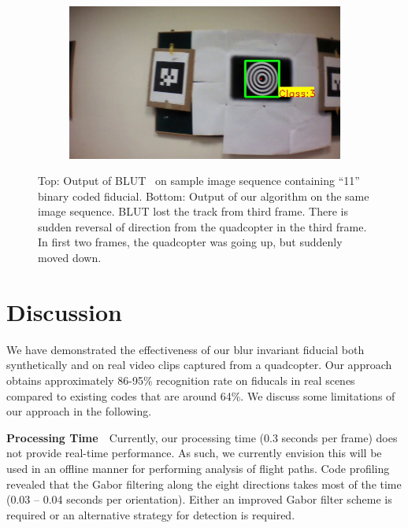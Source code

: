 \documentclass[runningheads]{llncs}
\begin{document}
\begin{figure}
\begin{subfigure}[b]{.19\textwidth}
\end{subfigure}
\begin{subfigure}[b]{.19\textwidth}
\includegraphics[width=\linewidth]{BLUT_input_11/output6.jpg}
\end{subfigure}
\caption{Top: Output of BLUT~\cite{Wu:2011} on sample image sequence containing
``11'' binary coded fiducial. Bottom: Output of our algorithm on the same image
sequence. BLUT lost the track from third frame. There is sudden reversal of
direction from the quadcopter in the third frame. In first two frames, the quadcopter was
going up, but suddenly moved down.}
\label{fig:BLUT_compare_11}
\end{figure}

\section{Discussion}\label{sec:discussion}

We have demonstrated the effectiveness of our blur invariant fiducial both
synthetically and on real video clips captured from a quadcopter.   Our approach obtains
approximately 86-95\% recognition rate on fiducals in real scenes compared to existing codes
that are around 64\%.  We discuss some limitations of our approach in the following.

\noindent\textbf{Processing Time}~~Currently, our processing time (0.3 seconds
per frame) does not provide real-time performance.  As such, we currently
envision this will be used in an offline manner for performing analysis of
flight paths. Code profiling revealed that the Gabor filtering along the eight
directions takes most of the time (0.03 -- 0.04 seconds per orientation).  Either an
improved Gabor filter scheme is required or an alternative strategy for
detection is required.
\end{document}

